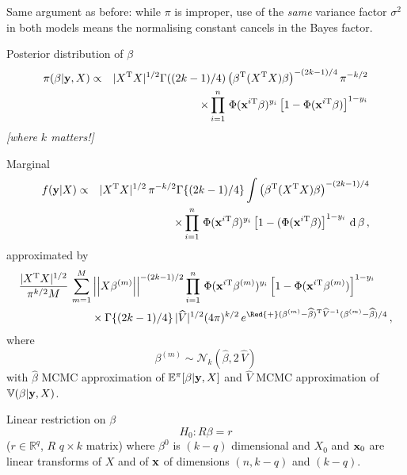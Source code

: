 \begin{slide}

Same argument as before: while $\pi$ is improper, use of the {\em same}
variance factor $\sigma^2$ in both models
means the normalising constant cancels in the Bayes factor.

\pause
\vs Posterior distribution of $\beta$\footnotesize
\begin{eqnarray*}
\pi(\beta|\mathbf{y},X) & \propto & |X^{\mathrm{T}} X|^{1/2} \Gamma((2k-1)/4)\left(\beta^{\mathrm{T}}(X^{\mathrm{T}} X)\beta\right)^{-(2k-1)/4}
	\pi^{-k/2} \nonumber \\
               && \times\prod_{i=1}^n\,\Phi( \mathbf{x}^{i\mathrm{T}}\beta)^{y_i}\left[1-\Phi(\mathbf{x}^{i\mathrm{T}}\beta)\right]^{1-y_i}
\end{eqnarray*}\normalsize
{\em [where $k$ matters!]}

\end{slide}\begin{slide}

Marginal\footnotesize
\begin{eqnarray*}
f(\mathbf{y}|X) & \propto & |X^{\mathrm{T}} X|^{1/2}\,\pi^{-k/2}\Gamma\{(2k-1)/4\} \int \left(\beta^{\mathrm{T}}(X^{\mathrm{T}} X)\beta\right)^{-(2k-1)/4} \\
&& \quad\times\prod_{i=1}^n\,\Phi(\mathbf{x}^{i\mathrm{T}}\beta)^{y_i}\left[1-(\Phi(
\mathbf{x}^{i\mathrm{T}}\beta)\right]^{1-y_i}\,\text{d}\,\beta\,,
\end{eqnarray*}
\normalsize approximated by\footnotesize
\begin{align*}
\frac{|X^\tee X|^{1/2}}{\pi^{k/2}M}\,\sum_{m=1}^M &\left|\left|X\beta^{(m)}\right|\right|^{-(2k-1)/2}
\prod_{i=1}^n\,\Phi( \bx^{i\tee}{\beta^{(m)}})^{y_i} \left[1-\Phi(
\bx^{i\tee}{\beta^{(m)}})\right]^{1-y_i}\nonumber\\ &\times
\Gamma\{(2k-1)/4\}\,|\widehat V|^{1/2}(4\pi)^{k/2}\,
e^{\Red{+}({\beta^{(m)}}-\widehat\beta)^\tee \widehat
V^{-1}({\beta^{(m)}}-\widehat\beta)/4}\,,
\end{align*}\normalsize
where 
$$
\beta^{(m)} \sim \mathscr{N}_k(\widehat\beta,2\,\widehat V)
$$
with $\widehat\beta$ MCMC approximation of $\mathbb{E}^\pi[\beta|\mathbf{y},X]$
and $\widehat    V$ MCMC approximation of $\mathbb{V}(\beta|\mathbf{y},X)$.

\end{slide}\begin{slide}

Linear restriction on $\beta$ 
$$
H_0:R\beta=r
$$
($r\in \mathbb{R}^q$, $R$ $q\times k$ matrix)
where $\beta^0$ is $(k-q)$ dimensional and $X_0$ and $\mathbf{x}_0$ are linear transforms of $X$ and of $\mathbf{x}$ of dimensions
$(n,k-q)$ and $(k-q)$. 


\end{slide}
